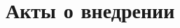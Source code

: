 \chapter{Акты о внедрении} \label{app:B}
	\begin{figure}[ht]
	\end{figure}
		\begin{figure}[ht]
	\end{figure}
%
%
%
%
%
